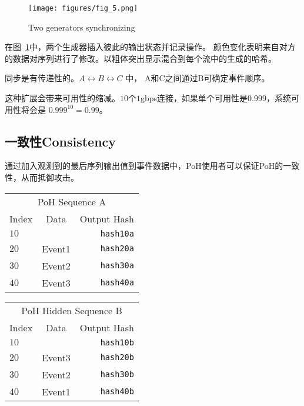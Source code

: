 \documentclass[12pt, uft8]{ctexart}
\begin{document}
\begin{figure}
  \begin{center}
    \centering
    \texttt{[image: figures/fig\_5.png]}
    \caption[Fig 5]{Two generators synchronizing\label{fig:poh_scale}}
  \end{center}
  \end{figure}

在图~\ref{fig:poh_scale}中，两个生成器插入彼此的输出状态并记录操作。 颜色变化表明来自对方的数据对序列进行了修改。以粗体突出显示混合到每个流中的生成的哈希。  

同步是有传递性的。\(A \leftrightarrow B \leftrightarrow C\) 中， A和C之间通过B可确定事件顺序。

这种扩展会带来可用性的缩减。$10$个$1$gbps连接，如果单个可用性是0.999，系统可用性将会是 \(0.999^{10} = 0.99 \)。

\subsection{一致性Consistency}
通过加入观测到的最后序列输出值到事件数据中，PoH使用者可以保证PoH的一致性，从而抵御攻击。\\

\begin{center}
  \begin{tabular}{ | l c r |}
    \hline
    \multicolumn{3}{|c|}{PoH Sequence A} \\
    Index & Data & Output Hash  \\ \hline
    $10$ & & \texttt{hash10a} \\
    $20$ & Event1 & \texttt{hash20a} \\
    $30$ & Event2 & \texttt{hash30a} \\
    $40$ & Event3 & \texttt{hash40a} \\
    \hline
    \end{tabular}
  \begin{tabular}{ | l c r |}
    \hline
    \multicolumn{3}{|c|}{PoH Hidden Sequence B} \\
    Index & Data & Output Hash \\ \hline
    $10$ & & \texttt{hash10b}\\
    $20$ & Event3 & \texttt{hash20b}  \\
    $30$ & Event2 & \texttt{hash30b} \\
    $40$ & Event1 & \texttt{hash40b} \\
    \hline
    \end{tabular}
\end{center}
\end{document}
